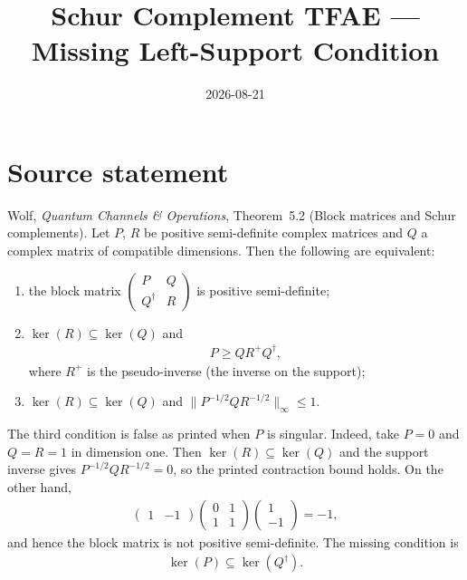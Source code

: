 \documentclass{article}
\title{Schur Complement TFAE --- Missing Left-Support Condition}
\author{}
\date{2026-08-21}
\begin{document}
\maketitle
{}

\section{Source statement}
Wolf, \textit{Quantum Channels \& Operations}, Theorem~5.2 (Block matrices and
Schur complements). Let $P$, $R$ be positive semi-definite complex matrices
and $Q$ a complex matrix of compatible dimensions. Then the following are
equivalent:
\begin{enumerate}
  \item the block matrix
    $\begin{pmatrix} P & Q \\ Q^\dagger & R \end{pmatrix}$
    is positive semi-definite;
  \item $\ker(R) \subseteq \ker(Q)$ and
    \begin{align}
      P \ge Q R^{+} Q^\dagger,
      \tag{Wolf, Theorem 5.2 (2)}
    \end{align}
    where $R^{+}$ is the pseudo-inverse (the inverse on the support);
  \item $\ker(R) \subseteq \ker(Q)$ and
    $\|P^{-1/2} Q R^{-1/2}\|_\infty \le 1$.
\end{enumerate}

The third condition is false as printed when $P$ is singular. Indeed, take
$P=0$ and $Q=R=1$ in dimension one. Then
$\ker(R)\subseteq\ker(Q)$ and the support inverse gives
$P^{-1/2}QR^{-1/2}=0$, so the printed contraction bound holds. On the other
hand,
\begin{align}
  \begin{pmatrix}1&-1\end{pmatrix}
  \begin{pmatrix}0&1\\1&1\end{pmatrix}
  \begin{pmatrix}1\\-1\end{pmatrix}=-1,
\end{align}
and hence the block matrix is not positive semi-definite. The missing
condition is
\begin{align}
  \ker(P)\subseteq\ker(Q^\dagger).
  \tag{left-support condition}
\end{align}
\end{document}
